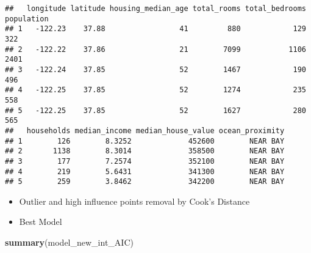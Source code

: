\documentclass[
]{article}
\newenvironment{Shaded}{\begin{snugshade}}{\end{snugshade}}
\newcommand{\KeywordTok}[1]{\textcolor[rgb]{0.13,0.29,0.53}{\textbf{#1}}}
\newcommand{\NormalTok}[1]{#1}
\begin{document}
\begin{verbatim}
##   longitude latitude housing_median_age total_rooms total_bedrooms population
## 1   -122.23    37.88                 41         880            129        322
## 2   -122.22    37.86                 21        7099           1106       2401
## 3   -122.24    37.85                 52        1467            190        496
## 4   -122.25    37.85                 52        1274            235        558
## 5   -122.25    37.85                 52        1627            280        565
##   households median_income median_house_value ocean_proximity
## 1        126        8.3252             452600        NEAR BAY
## 2       1138        8.3014             358500        NEAR BAY
## 3        177        7.2574             352100        NEAR BAY
## 4        219        5.6431             341300        NEAR BAY
## 5        259        3.8462             342200        NEAR BAY
\end{verbatim}

\begin{itemize}
\item
  Outlier and high influence points removal by Cook's Distance
\item
  Best Model
\end{itemize}

\begin{Shaded}
\begin{Highlighting}[]
\KeywordTok{summary}\NormalTok{(model_new_int_AIC)}
\end{Highlighting}
\end{Shaded}
\end{document}
